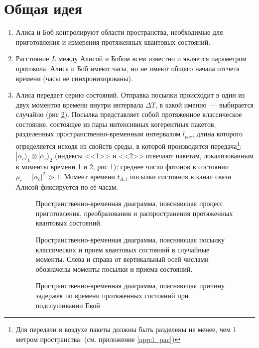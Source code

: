 \section[Общая схема протокола]{Общая идея}\label{sec:common_description}

\begin{enumerate}
  \item Алиса и Боб контролируют области пространства, необходимые для приготовления и измерения протяженных квантовых состояний.
  \item Расстояние $L$ между Алисой и Бобом всем известно и является параметром протокола. Алиса и Боб имеют часы, но не имеют общего начала отсчета времени (часы не синхронизированы).
  \item Алиса передает серию состояний. Отправка посылки происходит в один из двух моментов времени внутри интервала $\Delta T$, в какой именно~--- выбирается случайно (рис \ref{fig:timeline}). 
  Посылка представляет собой протяженное классическое состояние, состоящее из пары интенсивных когерентных пакетов, разделенных пространственно-временным интервалом $l_{pac}$, длина которого определяется исходя из свойств среды, в которой производится передача\footnote{Для передачи в воздухе пакеты должны быть разделены не менее, чем 1 метром пространства: (см. приложение \ref{app:l_pac})}: 
  $|\alpha_c\rangle_1 \otimes|\alpha_c\rangle_2$ (индексы <<1>> и <<2>> отвечают пакетам, локализованным в моменты времени 1 и 2, рис \ref{fig:process}); среднее число фотонов в состоянии $\mu_c = |\alpha_c|^2 \gg 1$. 
  Момент времени $t_{A,i}$ посылки состояния в канал связи Алисой фиксируется по её часам.
  
  \begin{figure}[h]
  \caption{Пространственно-временная диаграмма, поясняющая процесс приготовления, преобразования и распространения протяженных квантовых состояний.}
  \label{fig:process}
  \end{figure}
  \begin{figure}[h]
  \caption{Пространственно-временная диаграмма, поясняющая посылку классических и прием квантовых состояний в случайные моменты. Слева и справа от вертикальный осей числами обозначены моменты посылки и приема состояний. }
  \label{fig:timeline}
  \end{figure}
  \begin{figure}[h]
  \caption{Пространственно-временная диаграмма, поясняющая причину задержек по времени протяженных состояний при подслушивании Евой}
  \label{fig:detected}
  \end{figure}
  

\end{enumerate}
